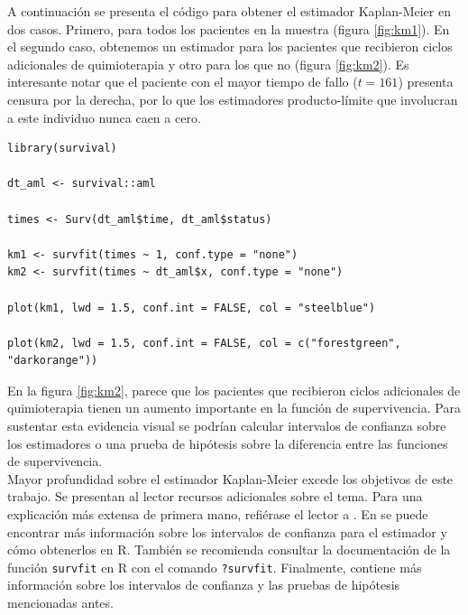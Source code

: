 \documentclass[11pt,a4paper]{article}
\begin{document}
A continuación se presenta el código para obtener el estimador Kaplan-Meier en dos casos. Primero, para todos los pacientes en la muestra (figura \ref{fig:km1}). En el segundo caso, obtenemos un estimador para los pacientes que recibieron ciclos adicionales de quimioterapia y otro para los que no (figura \ref{fig:km2}). Es interesante notar que el paciente con el mayor tiempo de fallo ($t = 161$) presenta censura por la derecha, por lo que los estimadores producto-límite que involucran a este individuo nunca caen a cero.\\

\begin{lstlisting}
library(survival)

dt_aml <- survival::aml

times <- Surv(dt_aml$time, dt_aml$status)

km1 <- survfit(times ~ 1, conf.type = "none")
km2 <- survfit(times ~ dt_aml$x, conf.type = "none")

plot(km1, lwd = 1.5, conf.int = FALSE, col = "steelblue")

plot(km2, lwd = 1.5, conf.int = FALSE, col = c("forestgreen", "darkorange"))
\end{lstlisting}\leavevmode\newline

En la figura \ref{fig:km2}, parece que los pacientes que recibieron ciclos adicionales de quimioterapia tienen un aumento importante en la función de supervivencia. Para sustentar esta evidencia visual se podrían calcular intervalos de confianza sobre los estimadores o una prueba de hipótesis sobre la diferencia entre las funciones de supervivencia.\\

Mayor profundidad sobre el estimador Kaplan-Meier excede los objetivos de este trabajo. Se presentan al lector recursos adicionales sobre el tema. Para una explicación más extensa de primera mano, refiérase el lector a \cite{kaplan-meier}. En \cite{moore} se puede encontrar más información sobre los intervalos de confianza para el estimador y cómo obtenerlos en R. También se recomienda consultar la documentación de la función \texttt{survfit} en R con el comando \texttt{?survfit}. Finalmente, \cite{klein} contiene más información sobre los intervalos de confianza y las pruebas de hipótesis mencionadas antes.\\
\end{document}
